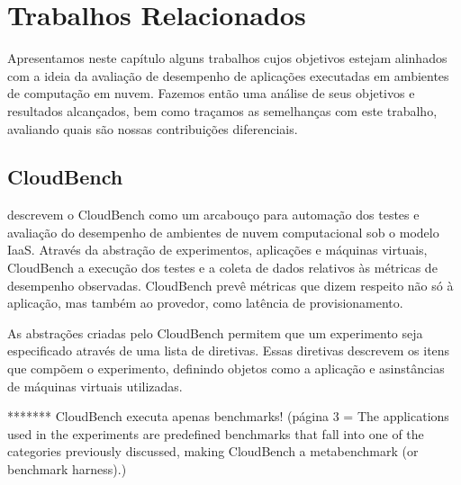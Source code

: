 \chapter[Trabalhos Relacionados]{Trabalhos Relacionados}
Apresentamos  neste capítulo alguns trabalhos cujos objetivos estejam alinhados 
com a ideia da avaliação de desempenho de aplicações executadas em ambientes de
computação em nuvem. Fazemos então uma análise de seus objetivos e resultados 
alcançados, bem como traçamos as semelhanças com este trabalho, avaliando quais são
nossas contribuições diferenciais.

\section{CloudBench}
\cite{silva2013cloudbench} descrevem o CloudBench como um arcabouço para 
automação dos testes e avaliação do desempenho de ambientes de nuvem computacional 
sob o modelo IaaS. Através da abstração de experimentos, aplicações e máquinas 
virtuais, CloudBench a execução dos testes e a coleta de dados relativos
às métricas de desempenho observadas. CloudBench prevê métricas que dizem respeito
não só à aplicação, mas também ao provedor, como latência de provisionamento. 

As abstrações criadas pelo CloudBench permitem que um experimento seja 
especificado através de uma lista de diretivas. Essas diretivas descrevem os itens
que compõem o experimento, definindo objetos como a aplicação e asinstâncias de 
máquinas virtuais utilizadas.

******* CloudBench executa apenas benchmarks! 
(página 3 = The applications used in the experiments are predefined
benchmarks that fall into one of the categories
previously discussed, making CloudBench a metabenchmark
(or benchmark harness).)


\cite{li2011cloudprophet}